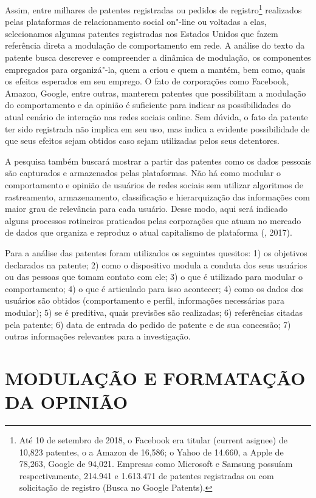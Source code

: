 Assim, entre milhares de patentes registradas ou pedidos de
registro\footnote{Até 10 de setembro de 2018, o Facebook era titular
  (current asignee) de 10,823 patentes, o a Amazon de 16,586; o Yahoo de
  14.660, a Apple de 78,263, Google de 94,021. Empresas como Microsoft e
  Samsung possuíam respectivamente, 214.941 e 1.613.471 de patentes
  registradas ou com solicitação de registro (Busca no Google Patents).}
realizados pelas plataformas de relacionamento social on"-line ou
voltadas a elas, selecionamos algumas patentes registradas nos Estados
Unidos que fazem referência direta a modulação de comportamento em rede.
A análise do texto da patente busca descrever e compreender a dinâmica
de modulação, os componentes empregados para organizá"-la, quem a criou e
quem a mantém, bem como, quais os efeitos esperados em seu emprego. O
fato de corporações como Facebook, Amazon, Google, entre outras,
manterem patentes que possibilitam a modulação do comportamento e da
opinião é suficiente para indicar as possibilidades do atual cenário de
interação nas redes sociais online. Sem dúvida, o fato da patente ter
sido registrada não implica em seu uso, mas indica a evidente
possibilidade de que seus efeitos sejam obtidos caso sejam utilizadas
pelos seus detentores.

A pesquisa também buscará mostrar a partir das patentes como os dados
pessoais são capturados e armazenados pelas plataformas. Não há como
modular o comportamento e opinião de usuários de redes sociais sem
utilizar algoritmos de rastreamento, armazenamento, classificação e
hierarquização das informações com maior grau de relevância para cada
usuário. Desse modo, aqui será indicado alguns processos rotineiros
praticados pelas corporações que atuam no mercado de dados que organiza
e reproduz o atual capitalismo de plataforma (, 2017).

Para a análise das patentes foram utilizados os seguintes quesitos: 1)
os objetivos declarados na patente; 2) como o dispositivo modula a
conduta dos seus usuários ou das pessoas que tomam contato com ele; 3) o
que é utilizado para modular o comportamento; 4) o que é articulado para
isso acontecer; 4) como os dados dos usuários são obtidos (comportamento
e perfil, informações necessárias para modular); 5) se é preditiva,
quais previsões são realizadas; 6) referências citadas pela patente; 6)
data de entrada do pedido de patente e de sua concessão; 7) outras
informações relevantes para a investigação.

\section{MODULAÇÃO E FORMATAÇÃO DA OPINIÃO}

